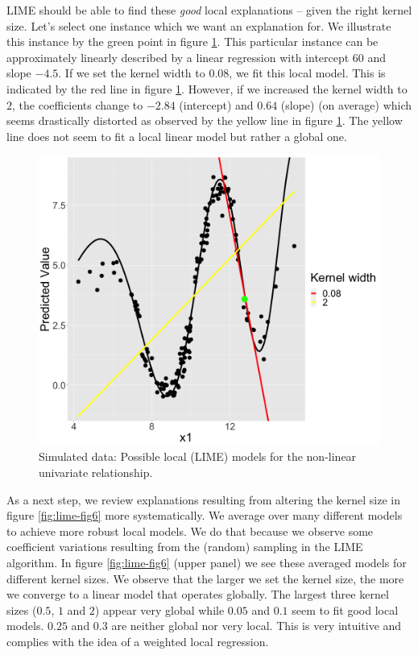 \documentclass[]{krantz}
\begin{document}
LIME should be able to find these \emph{good} local explanations --
given the right kernel size. Let's select one instance which we want an
explanation for. We illustrate this instance by the green point in
figure \ref{fig:lime-fig5}. This particular instance can be
approximately linearly described by a linear regression with intercept
\(60\) and slope \(-4.5\). If we set the kernel width to \(0.08\), we
fit this local model. This is indicated by the red line in figure
\ref{fig:lime-fig5}. However, if we increased the kernel width to \(2\),
the coefficients change to \(-2.84\) (intercept) and \(0.64\) (slope)
(on average) which seems drastically distorted as observed by the yellow
line in figure \ref{fig:lime-fig5}. The yellow line does not seem to fit
a local linear model but rather a global one.

\begin{figure}

{\centering \includegraphics[width=0.99\linewidth]{images/04-09-05} 

}

\caption{Simulated data: Possible local (LIME) models for the non-linear univariate relationship.}\label{fig:lime-fig5}
\end{figure}

As a next step, we review explanations resulting from altering the
kernel size in figure \ref{fig:lime-fig6} more systematically. We
average over many different models to achieve more robust local models.
We do that because we observe some coefficient variations resulting from
the (random) sampling in the LIME algorithm. In figure
\ref{fig:lime-fig6} (upper panel) we see these averaged models for
different kernel sizes. We observe that the larger we set the kernel
size, the more we converge to a linear model that operates globally. The
largest three kernel sizes (\(0.5\), \(1\) and \(2\)) appear very global
while \(0.05\) and \(0.1\) seem to fit good local models. \(0.25\) and
\(0.3\) are neither global nor very local. This is very intuitive and
complies with the idea of a weighted local regression.
\end{document}
